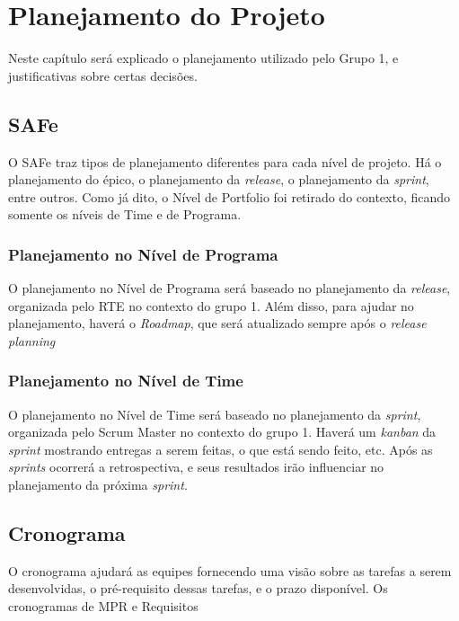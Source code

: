 \chapter[Planejamento do Projeto]{Planejamento do Projeto}
Neste capítulo será explicado o planejamento utilizado pelo Grupo 1, e justificativas sobre certas decisões.

\section{SAFe}
O SAFe traz tipos de planejamento diferentes para cada nível de projeto. Há o planejamento do épico, o planejamento da \emph{release}, o planejamento da \emph{sprint}, entre outros. Como já dito, o Nível de Portfolio foi retirado do contexto, ficando somente os níveis de Time e de Programa.

\subsection{Planejamento no Nível de Programa}
O planejamento no Nível de Programa será baseado no planejamento da \emph{release}, organizada pelo RTE no contexto do grupo 1. Além disso, para ajudar no planejamento, haverá o \emph{Roadmap}, que será atualizado sempre após o \emph{release planning}

\subsection{Planejamento no Nível de Time}
O planejamento no Nível de Time será baseado no planejamento da \emph{sprint}, organizada pelo Scrum Master no contexto do grupo 1. Haverá um \emph{kanban} da \emph{sprint} mostrando entregas a serem feitas, o que está sendo feito, etc. Após as \emph{sprints} ocorrerá a retrospectiva, e seus resultados irão influenciar no planejamento da próxima \emph{sprint}.

\section{Cronograma}
O cronograma ajudará as equipes fornecendo uma visão sobre as tarefas a serem desenvolvidas, o pré-requisito dessas tarefas, e o prazo disponível. Os cronogramas de MPR e Requisitos